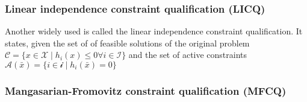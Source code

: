     \subsubsection{Linear independence constraint qualification (LICQ)}
    Another widely used is called the linear independence constraint qualification. It states,
    given the set of of feasible solutions of the original problem $\mathcal{C} = \{x \in \mathcal{X} \; | \; h_i(x) \leq 0
    \forall i \in \mathcal{I} \}$ and the set of active constraints $\mathcal{A}(\bar{x}) = \{i \in \mathcal{i} \; | \; h_i(\bar{x}) = 0 \}$

    \subsubsection{Mangasarian-Fromovitz constraint qualification (MFCQ)}



